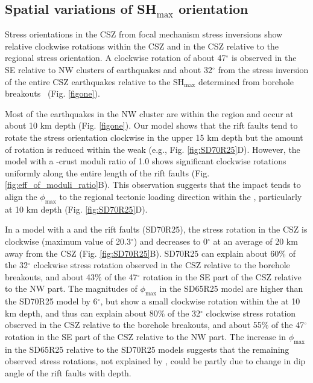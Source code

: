 \documentclass[draft]{agujournal2018}
\begin{document}
\subsection{Spatial variations of SH$_{\max}$ orientation}
Stress orientations in the CSZ from focal mechanism stress inversions \citep{Zoback_1992,Mazzotti_2010} show relative clockwise rotations within the CSZ and in the CSZ relative to the regional stress orientation. A clockwise rotation of about 47$^\circ$ is observed in the SE relative to NW clusters of earthquakes and about 32$^\circ$ from the stress inversion of the entire CSZ earthquakes relative to the SH$_{\max}$ determined from borehole breakouts~\citep{Zoback_1992,Mazzotti_2010} (Fig. \ref{figone}).

Most of the earthquakes in the NW cluster are within the  region and occur at about 10 km depth (Fig. \ref{figone}). Our model shows that the rift faults tend to rotate the stress orientation clockwise in the upper 15 km depth but the amount of rotation is reduced within the weak  (e.g., Fig. \ref{fig:SD70R25}D). However, the model with a -crust moduli ratio of 1.0 shows significant clockwise rotations uniformly along the entire length of the rift faults (Fig. \ref{fig:eff_of_moduli_ratio}B). This observation suggests that the impact  tends to align the $\phi_{\max}$ to the regional tectonic loading direction within the , particularly at 10 km depth (Fig. \ref{fig:SD70R25}D).

In a model with a  and the rift faults (SD70R25), the stress rotation in the CSZ is clockwise (maximum value of 20.3$^\circ$) and decreases to 0$^\circ$ at an average of 20 km away from the CSZ (Fig. \ref{fig:SD70R25}B). SD70R25 can explain about 60$\%$ of the 32$^\circ$ clockwise stress rotation observed in the CSZ relative to the borehole breakouts, and about 43$\%$ of the 47$^\circ$ rotation in the SE part of the CSZ relative to the NW part. The magnitudes of $\phi_{\max}$ in the SD65R25 model are higher than the SD70R25 model by 6$^\circ$, but show a small clockwise rotation within the  at 10 km depth, and thus can explain about 80$\%$ of the 32$^\circ$ clockwise stress rotation observed in the CSZ relative to the borehole breakouts, and about 55$\%$ of the 47$^\circ$ rotation in the SE part of the CSZ relative to the NW part. The increase in $\phi_{\max}$ in the SD65R25 relative to the SD70R25 models suggests that the remaining observed stress rotations, not explained by , could be partly due to change in dip angle of the rift faults with depth. 
\end{document}
